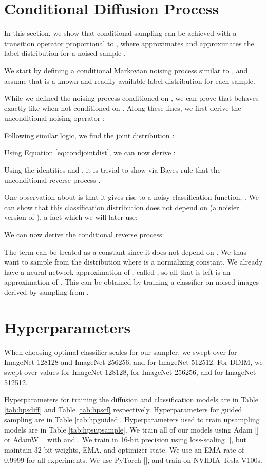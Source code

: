 \documentclass{article}
\newcommand{\shortcite}[1]{[\citenum{#1}]}
\begin{document}
\clearpage
\section{Conditional Diffusion Process}
\label{app:conditional}

In this section, we show that conditional sampling can be achieved with a transition operator proportional to , where  approximates  and  approximates the label distribution for a noised sample .

We start by defining a conditional Markovian noising process  similar to , and assume that  is a known and readily available label distribution for each sample.


While we defined the noising process  conditioned on , we can prove that  behaves exactly like  when not conditioned on . Along these lines, we first derive the unconditional noising operator :


Following similar logic, we find the joint distribution :


Using Equation \ref{eq:condjointdist}, we can now derive :


Using the identities  and , it is trivial to show via Bayes rule that the unconditional reverse process .

One observation about  is that it gives rise to a noisy classification function, . We can show that this classification distribution does not depend on  (a noisier version of ), a fact which we will later use:


We can now derive the conditional reverse process:


The  term can be treated as a constant since it does not depend on . We thus want to sample from the distribution  where  is a normalizing constant. We already have a neural network approximation of , called , so all that is left is an approximation of . This can be obtained by training a classifier  on noised images  derived by sampling from .

\clearpage
\section{Hyperparameters}
\label{app:hyperparameters}

When choosing optimal classifier scales for our sampler, we swept over  for ImageNet 128128 and ImageNet 256256, and  for ImageNet 512512. For DDIM, we swept over values  for ImageNet 128128,  for ImageNet 256256, and  for ImageNet 512512.

Hyperparameters for training the diffusion and classification models are in Table \ref{tab:hpsdiff} and Table \ref{tab:hpscf} respectively. Hyperparameters for guided sampling are in Table \ref{tab:hpguided}. Hyperparameters used to train upsampling models are in Table \ref{tab:hpsupsample}. We train all of our models using Adam \shortcite{adam} or AdamW \shortcite{adamw} with  and . We train in 16-bit precision using loss-scaling \shortcite{lossscaling}, but maintain 32-bit weights, EMA, and optimizer state. We use an EMA rate of 0.9999 for all experiments. We use PyTorch \shortcite{pytorch}, and train on NVIDIA Tesla V100s.
\end{document}
